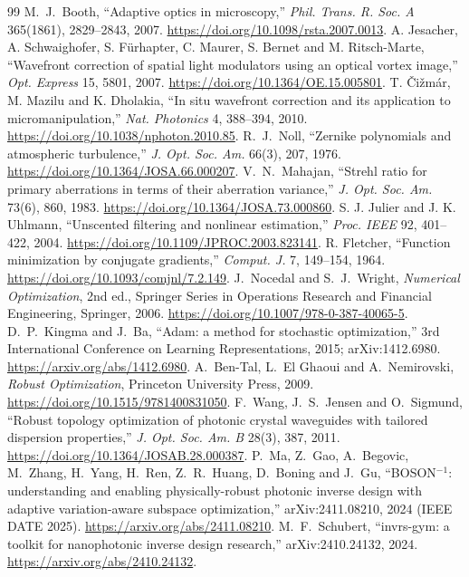 \begin{thebibliography}{99}
 M.~J.~Booth, ``Adaptive optics in microscopy,'' \emph{Phil. Trans. R. Soc. A} 365(1861), 2829--2843, 2007. \url{https://doi.org/10.1098/rsta.2007.0013}.
 A. Jesacher, A. Schwaighofer, S. F\"urhapter, C. Maurer, S. Bernet and M. Ritsch-Marte, ``Wavefront correction of spatial light modulators using an optical vortex image,'' \emph{Opt. Express} 15, 5801, 2007. \url{https://doi.org/10.1364/OE.15.005801}.
 T. \v{C}i\v{z}m\'ar, M. Mazilu and K. Dholakia, ``In situ wavefront correction and its application to micromanipulation,'' \emph{Nat. Photonics} 4, 388--394, 2010. \url{https://doi.org/10.1038/nphoton.2010.85}.
 R.~J.~Noll, ``Zernike polynomials and atmospheric turbulence,'' \emph{J. Opt. Soc. Am.} 66(3), 207, 1976. \url{https://doi.org/10.1364/JOSA.66.000207}.
 V.~N.~Mahajan, ``Strehl ratio for primary aberrations in terms of their aberration variance,'' \emph{J. Opt. Soc. Am.} 73(6), 860, 1983. \url{https://doi.org/10.1364/JOSA.73.000860}.
 S. J. Julier and J. K. Uhlmann, ``Unscented filtering and nonlinear estimation,'' \emph{Proc. IEEE} 92, 401--422, 2004. \url{https://doi.org/10.1109/JPROC.2003.823141}.
 R. Fletcher, ``Function minimization by conjugate gradients,'' \emph{Comput. J.} 7, 149--154, 1964. \url{https://doi.org/10.1093/comjnl/7.2.149}.
 J.~Nocedal and S.~J.~Wright, \emph{Numerical Optimization}, 2nd ed., Springer Series in Operations Research and Financial Engineering, Springer, 2006. \url{https://doi.org/10.1007/978-0-387-40065-5}.
 D.~P.~Kingma and J.~Ba, ``Adam: a method for stochastic optimization,'' 3rd International Conference on Learning Representations, 2015; arXiv:1412.6980. \url{https://arxiv.org/abs/1412.6980}.
 A.~Ben-Tal, L.~El Ghaoui and A.~Nemirovski, \emph{Robust Optimization}, Princeton University Press, 2009. \url{https://doi.org/10.1515/9781400831050}.
 F.~Wang, J.~S.~Jensen and O.~Sigmund, ``Robust topology optimization of photonic crystal waveguides with tailored dispersion properties,'' \emph{J. Opt. Soc. Am. B} 28(3), 387, 2011. \url{https://doi.org/10.1364/JOSAB.28.000387}.
 P.~Ma, Z.~Gao, A.~Begovic, M.~Zhang, H.~Yang, H.~Ren, Z.~R.~Huang, D.~Boning and J.~Gu, ``BOSON$^{-1}$: understanding and enabling physically-robust photonic inverse design with adaptive variation-aware subspace optimization,'' arXiv:2411.08210, 2024 (IEEE DATE 2025). \url{https://arxiv.org/abs/2411.08210}.
 M.~F.~Schubert, ``invrs-gym: a toolkit for nanophotonic inverse design research,'' arXiv:2410.24132, 2024. \url{https://arxiv.org/abs/2410.24132}.
\end{thebibliography}

